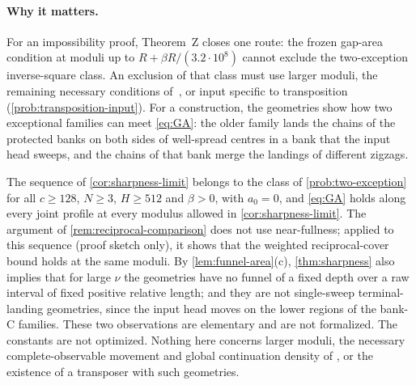 \paragraph{Why it matters.}
For an impossibility proof, Theorem~Z closes one route: the frozen gap-area condition at
moduli up to $R+\beta R/(3.2\cdot10^8)$ cannot exclude the two-exception inverse-square
class. An exclusion of that class must use larger moduli, the remaining necessary
conditions of~\cite{SourceCovers2026}, or input specific to transposition
(\cref{prob:transposition-input}). For a construction, the geometries show how two
exceptional families can meet \eqref{eq:GA}: the older family lands the chains of the
protected banks on both sides of well-spread centres in a bank that the input head
sweeps, and the chains of that bank merge the landings of different zigzags.

The sequence of \cref{cor:sharpness-limit} belongs to the class of
\cref{prob:two-exception} for all $c\ge128$, $N\ge3$, $H\ge512$ and $\beta>0$, with
$a_0=0$, and \eqref{eq:GA} holds along every joint profile at every modulus allowed in
\cref{cor:sharpness-limit}. The argument of \cref{rem:reciprocal-comparison} does not
use near-fullness; applied to this sequence (proof sketch only), it shows that the
weighted reciprocal-cover bound \cite[(4.8)]{SourceCovers2026} holds at the same moduli.
By \cref{lem:funnel-area}(c), \cref{thm:sharpness} also implies that for large $\nu$ the
geometries have no funnel of a fixed depth over a raw interval of fixed positive
relative length; and they are not single-sweep terminal-landing geometries, since the
input head moves on the lower regions of the bank-C families. These two observations
are elementary and are not formalized. The constants are not optimized. Nothing here
concerns larger moduli, the necessary complete-observable movement and global
continuation density of \cite[Corollaries~4.8 and~5.3]{SourceCovers2026}, or the
existence of a transposer with such geometries.
